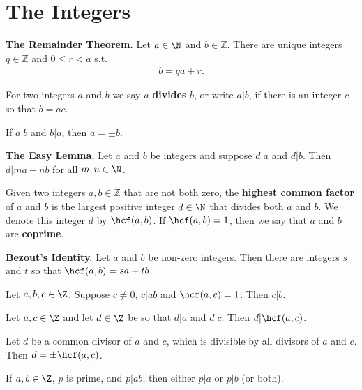 \documentclass{article}
\begin{document}
\section{The Integers}
\begin{theorem}
	\textbf{The Remainder Theorem.} Let $a\in\N$ and $b\in\mathbb{Z}$.
	There are unique integers $q\in\mathbb{Z}$ and $0\leq r<a$ s.t.
	\begin{align*}
		b=qa+r.
	\end{align*}
\end{theorem}
\begin{definition}
	For two integers $a$ and $b$ we say $a$ \textbf{divides} $b$, or write $a|b$, if there is an integer $c$ so that $b=ac$.
\end{definition}
\begin{lemma}
	If $a|b$ and $b|a$, then $a=\pm b$.
\end{lemma}
\begin{lemma}
	\textbf{The Easy Lemma.} Let $a$ and $b$ be integers and suppose $d|a$ and $d|b$. Then $d|ma+nb$ for all $m,n\in\N$.
\end{lemma}
\begin{definition}
	Given two integers $a,b\in\mathbb{Z}$ that are not both zero, the \textbf{highest common factor} of $a$ and $b$ is the largest positive integer $d\in\N$ that divides both $a$ and $b$.
	We denote this integer $d$ by $\hcf(a,b)$. If $\hcf(a,b)=1$, then we say that $a$ and $b$ are \textbf{coprime}.
\end{definition}
\begin{theorem}
	\textbf{Bezout's Identity.} Let $a$ and $b$ be non-zero integers. Then there are integers $s$ and $t$ so that $\hcf(a,b)=sa+tb$.
\end{theorem}
\begin{corollary}
	Let $a,b,c\in\Z$. Suppose $c\not=0$, $c|ab$ and $\hcf(a,c)=1$. Then $c|b$.
\end{corollary}
\begin{corollary}
	Let $a,c\in\Z$ and let $d\in\Z$ be so that $d|a$ and $d|c$. Then $d|\hcf(a,c)$.
\end{corollary}
\begin{corollary}
	Let $d$ be a common divisor of $a$ and $c$, which is divisible by all divisors of $a$ and $c$. Then $d=\pm\hcf(a,c)$.
\end{corollary}
\begin{corollary}
	If $a,b\in\Z$, $p$ is prime, and $p|ab$, then either $p|a$ or $p|b$ (or both).
\end{corollary}
\end{document}
